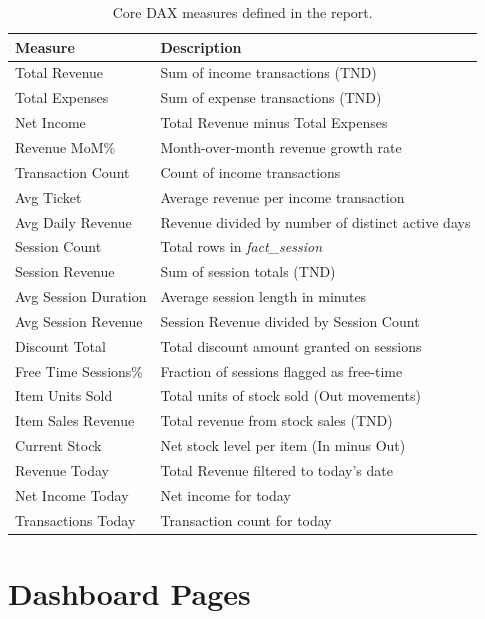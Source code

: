 \begin{table}[H]
  \centering
  \caption{Core DAX measures defined in the report.}
  \begin{tabular}{ll}
    \toprule
    \textbf{Measure} & \textbf{Description} \\
    \midrule
    Total Revenue          & Sum of income transactions (TND) \\
    Total Expenses         & Sum of expense transactions (TND) \\
    Net Income             & Total Revenue minus Total Expenses \\
    Revenue MoM\%          & Month-over-month revenue growth rate \\
    Transaction Count      & Count of income transactions \\
    Avg Ticket             & Average revenue per income transaction \\
    Avg Daily Revenue      & Revenue divided by number of distinct active days \\
    \midrule
    Session Count          & Total rows in \textit{fact\_session} \\
    Session Revenue        & Sum of session totals (TND) \\
    Avg Session Duration   & Average session length in minutes \\
    Avg Session Revenue    & Session Revenue divided by Session Count \\
    Discount Total         & Total discount amount granted on sessions \\
    Free Time Sessions\%   & Fraction of sessions flagged as free-time \\
    \midrule
    Item Units Sold        & Total units of stock sold (Out movements) \\
    Item Sales Revenue     & Total revenue from stock sales (TND) \\
    Current Stock          & Net stock level per item (In minus Out) \\
    \midrule
    Revenue Today          & Total Revenue filtered to today's date \\
    Net Income Today       & Net income for today \\
    Transactions Today     & Transaction count for today \\
    \bottomrule
  \end{tabular}
\end{table}

\section{Dashboard Pages}

